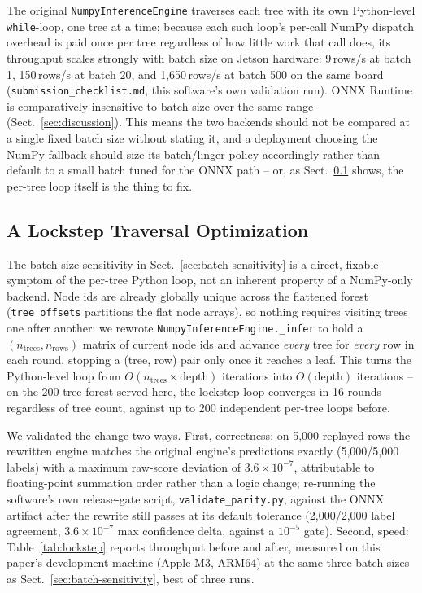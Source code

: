 \documentclass[runningheads]{llncs}
\begin{document}
The original \texttt{NumpyInferenceEngine} traverses each tree with its own Python-level \texttt{while}-loop, one tree at a time; because each such loop's per-call NumPy dispatch overhead is paid once per tree regardless of how little work that call does, its throughput scales strongly with batch size on Jetson hardware: 9\,rows/s at batch 1, 150\,rows/s at batch 20, and 1{,}650\,rows/s at batch 500 on the same board (\texttt{submission\_checklist.md}, this software's own validation run). ONNX Runtime is comparatively insensitive to batch size over the same range (Sect.~\ref{sec:discussion}). This means the two backends should not be compared at a single fixed batch size without stating it, and a deployment choosing the NumPy fallback should size its batch/linger policy accordingly rather than default to a small batch tuned for the ONNX path -- or, as Sect.~\ref{sec:lockstep} shows, the per-tree loop itself is the thing to fix.

\subsection{A Lockstep Traversal Optimization}
\label{sec:lockstep}

The batch-size sensitivity in Sect.~\ref{sec:batch-sensitivity} is a direct, fixable symptom of the per-tree Python loop, not an inherent property of a NumPy-only backend. Node ids are already globally unique across the flattened forest (\texttt{tree\_offsets} partitions the flat node arrays), so nothing requires visiting trees one after another: we rewrote \texttt{NumpyInferenceEngine.\_infer} to hold a $(n_{\text{trees}}, n_{\text{rows}})$ matrix of current node ids and advance \emph{every} tree for \emph{every} row in each round, stopping a (tree, row) pair only once it reaches a leaf. This turns the Python-level loop from $O(n_{\text{trees}} \times \text{depth})$ iterations into $O(\text{depth})$ iterations -- on the 200-tree forest served here, the lockstep loop converges in 16 rounds regardless of tree count, against up to 200 independent per-tree loops before.

We validated the change two ways. First, correctness: on 5{,}000 replayed rows the rewritten engine matches the original engine's predictions exactly (5{,}000/5{,}000 labels) with a maximum raw-score deviation of $3.6\times10^{-7}$, attributable to floating-point summation order rather than a logic change; re-running the software's own release-gate script, \texttt{validate\_parity.py}, against the ONNX artifact after the rewrite still passes at its default tolerance (2{,}000/2{,}000 label agreement, $3.6\times10^{-7}$ max confidence delta, against a $10^{-5}$ gate). Second, speed: Table~\ref{tab:lockstep} reports throughput before and after, measured on this paper's development machine (Apple M3, ARM64) at the same three batch sizes as Sect.~\ref{sec:batch-sensitivity}, best of three runs.
\end{document}
